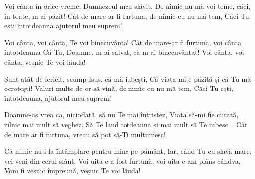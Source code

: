 \beginverse
Voi cânta în orice vreme, Dumnezeul meu slăvit,
De nimic nu mă voi teme, căci, în toate, m-ai păzit!
Cât de mare-ar fi furtuna, de nimic eu nu mă tem,
Căci Tu ești întotdeauna ajutorul meu suprem!
\endverse

\beginchorus
Voi cânta, voi cânta, Te voi binecuvânta!
Cât de mare-ar fi furtuna, voi cânta întotdeauna
Că Tu, Doamne, m-ai salvat, că m-ai binecuvântat!
Voi cânta, voi cânta, veșnic Te voi lăuda!
\endchorus

\beginverse
Sunt atât de fericit, scump Isus, că mă iubești,
Că viața mi-e păzită și că Tu mă ocrotești!
Valuri multe de-or să vină, de nimic eu nu mă tem,
Căci Tu ești, întotdeauna, ajutorul meu suprem!
\endverse

\beginverse
Doamne-aș vrea ca, niciodată, să nu Te mai întristez,
Viața să-mi fie curată, zilnic mai mult să veghez,
Să Te laud totdeauna și mai mult să Te iubesc...
Cât de mare ar fi furtuna, vreau să pot să-Ți mulțumesc!
\endverse

\beginverse
Că nimic nu-i la întâmplare pentru mine pe pământ,
Iar, când Tu cu slavă mare, vei veni din cerul sfânt,
Voi uita c-a fost furtună, voi uita c-am plâns cândva,
Vom fi veșnic împreună, veșnic Te voi lăuda!
\endverse
\endsong